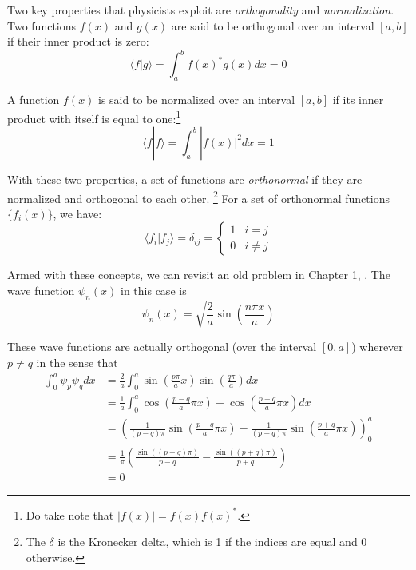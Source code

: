 Two key properties that physicists exploit are \textit{orthogonality} and \textit{normalization}. Two functions \(f(x)\) and \(g(x)\) are said to be orthogonal over an interval \([a, b]\) if their inner product is zero:
\begin{equation}
  \langle f | g \rangle = \int_a^b f(x)^* g(x) dx = 0
\end{equation}


A function \(f(x)\) is said to be normalized over an interval \([a, b]\) if its inner product with itself is equal to one:\footnote{Do take note that \(|f(x)|=f(x)f(x)^*\).}
\begin{equation}
  \langle f | f \rangle = \int_a^b |f(x)|^2 dx = 1
\end{equation}


With these two properties, a set of functions are \textit{orthonormal} if they are normalized and orthogonal to each other. \footnote{The \(\delta\) is the Kronecker delta, which is 1 if the indices are equal and 0 otherwise.} For a set of orthonormal functions \(\{f_i(x)\}\), we have:
\begin{equation}
  \langle f_i | f_j \rangle = \delta_{ij} = \begin{cases}
    1 & i = j \\
    0 & i \neq j
  \end{cases}
\end{equation}


Armed with these concepts, we can revisit an old problem in Chapter 1, . The wave function \(\psi_n(x)\) in this case is
\begin{equation}
  \psi_n(x) = \sqrt{\frac{2}{a}} \sin\left(\frac{n \pi x}{a}\right)
\end{equation}


These wave functions are actually orthogonal (over the interval \([0,a]\)) wherever \(p \neq q\) in the sense that
\begin{align*}
 \int_{0}^{a} \psi_p\psi_q dx &= \frac{2}{a} \int_0^a \sin\left(\frac{p\pi}{a}x\right)\sin\left(\frac{q\pi}{a}\right) dx \\
                       &= \frac{1}{a} \int_0^a \cos\left(\frac{p-q}{a}\pi x\right) - \cos\left(\frac{p+q}{a}\pi x\right) dx \\
                       &= \left(\frac{1}{(p-q)\pi}\sin\left(\frac{p-q}{a}\pi x\right) - \frac{1}{(p+q)\pi}\sin\left(\frac{p+q}{a}\pi x\right) \right)^{a}_{0} \\
                       &= \frac{1}{\pi}\left(\frac{\sin((p-q)\pi)}{p-q} - \frac{\sin((p+q)\pi)}{p+q} \right) \\
                       &= 0 
\end{align*}


